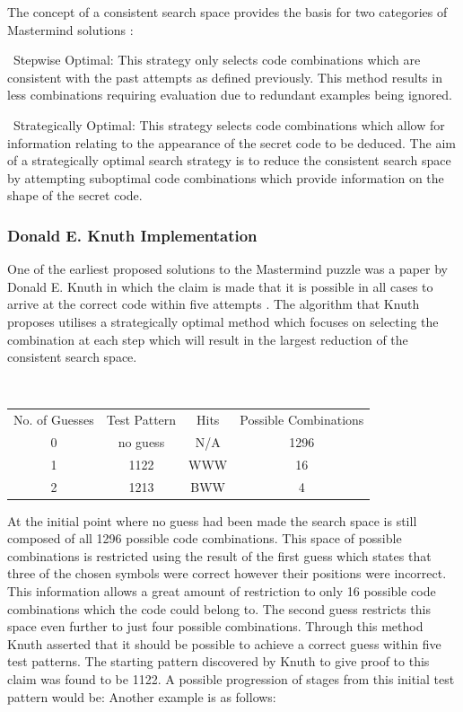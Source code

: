 \documentclass[11pt]{article}  %
\theoremstyle{definition}
\theoremstyle{remark}
\begin{document}
The concept of a consistent search space provides the basis for two categories of Mastermind solutions \cite{Haystack}:

\textbullet\ Stepwise Optimal: This strategy only selects code combinations which are consistent with the past attempts as defined previously. This method results in less combinations requiring evaluation due to redundant examples being ignored.

\textbullet\ Strategically Optimal: This strategy selects code combinations which allow for information relating to the appearance of the secret code to be deduced. The aim of a strategically optimal search strategy is to reduce the consistent search space by attempting suboptimal code combinations which provide information on the shape of the secret code.

\subsubsection {Donald E. Knuth Implementation}

One of the earliest proposed solutions to the Mastermind puzzle was a paper by Donald E. Knuth in which the claim is made that it is possible in all cases to arrive at the correct code within five attempts \cite {Wolfram} \cite {Knuth}. The algorithm that Knuth proposes utilises a strategically optimal method which focuses on selecting the combination at each step which will result in the largest reduction of the consistent search space.

\\

{
\centering
\begin{tabular}{cccc}
No. of Guesses & Test Pattern &  Hits  & Possible Combinations \\
0 & no guess & N/A & 1296 \\
1 & 1122 &  WWW  &  16 \\
2 & 1213 &  BWW  &  4 \\
\end {tabular} \par 
} 

At the initial point where no guess had been made the search space is still composed of all 1296 possible code combinations. This space of possible combinations is restricted using the result of the first guess which states that three of the chosen symbols were correct however their positions were incorrect. This information allows a great amount of restriction to only 16 possible code combinations which the code could belong to. The second guess restricts this space even further to just four possible combinations. Through this method Knuth asserted that it should be possible to achieve a correct guess within five test patterns. The starting pattern discovered by Knuth to give proof to this claim was found to be 1122. A possible progression of stages from this initial test pattern would be:
Another example is as follows:
\\
\end{document}
